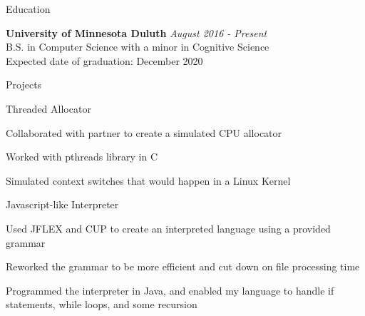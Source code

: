 \documentclass{resume} %
\begin{document}

\begin{rSection}{Education}

{\bf University of Minnesota Duluth} \hfill {\em August 2016 - Present} 
\\ B.S. in Computer Science with a minor in Cognitive Science
\\ Expected date of graduation: December 2020



\end{rSection}

\begin{rSection}{Projects}

\begin{rSubsection}{Threaded Allocator}{}{}\\
\item Collaborated with partner to create a simulated CPU allocator
\item Worked with pthreads library in C 
\item Simulated context switches that would happen in a Linux Kernel
\end{rSubsection}

\begin{rSubsection}{Javascript-like Interpreter}{}{}\\
\item Used JFLEX and CUP to create an interpreted language using a provided grammar
\item Reworked the grammar to be more efficient and cut down on file processing time
\item Programmed the interpreter in Java, and enabled my language to handle if statements, while loops, and some recursion
\end{rSubsection}

\end{rSection}
\end{document}
